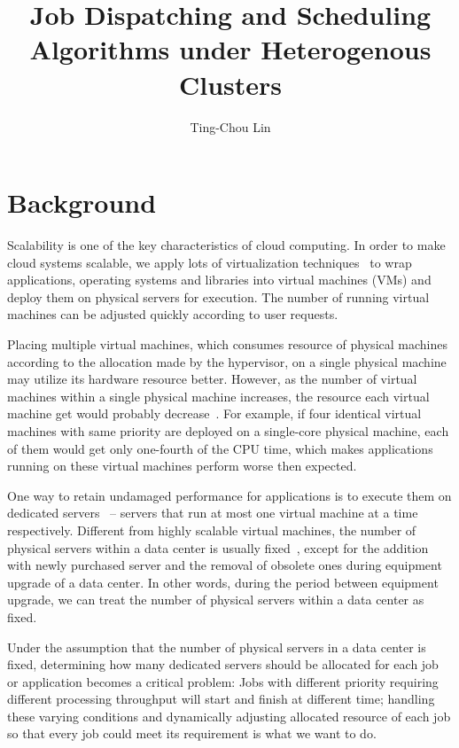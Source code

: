 \documentclass[11pt]{article}
\title{\textbf{Job Dispatching and Scheduling Algorithms under Heterogenous Clusters}}
\author{Ting-Chou Lin\\}
\date{}
\begin{document}
\maketitle

\section{Background}

Scalability is one of the key characteristics of cloud computing.  In
order to make cloud systems scalable, we apply lots of virtualization
techniques~\cite{secure_virt_for_cloud, cloud_issue} to wrap
applications, operating systems and libraries into virtual machines
(VMs) and deploy them on physical servers for execution.  The number of
running virtual machines can be adjusted quickly according to user
requests.

Placing multiple virtual machines, which consumes resource of physical
machines according to the allocation made by the hypervisor, on a single
physical machine may utilize its hardware resource better.  However, as
the number of virtual machines within a single physical machine
increases, the resource each virtual machine get would probably
decrease~\cite{resource_overbooking}.  For example, if four identical
virtual machines with same priority are deployed on a single-core
physical machine, each of them would get only one-fourth of the CPU
time, which makes applications running on these virtual machines perform
worse then expected.

One way to retain undamaged performance for applications is to execute
them on dedicated servers~\cite{dedicated_hosting} -- servers that run
at most one virtual machine at a time respectively.  Different from
highly scalable virtual machines, the number of physical servers within
a data center is usually fixed~\cite{maintenance_framework}, except for
the addition with newly purchased server and the removal of obsolete
ones during equipment upgrade of a data center.  In other words, during
the period between equipment upgrade, we can treat the number of
physical servers within a data center as fixed.

Under the assumption that the number of physical servers in a data
center is fixed, determining how many dedicated servers should be
allocated for each job or application becomes a critical problem:  Jobs
with different priority requiring different processing throughput will
start and finish at different time; handling these varying conditions
and dynamically adjusting allocated resource of each job so that every
job could meet its requirement is what we want to do.
\end{document}
